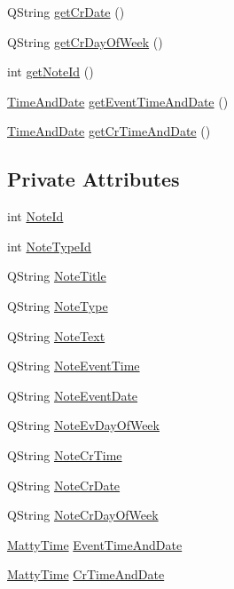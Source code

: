 \begin{DoxyCompactItemize}
\item 
Q\+String \hyperlink{classMattyNote_ade5ef053d6d9ba158d9842feadd39754}{get\+Cr\+Date} ()
\item 
Q\+String \hyperlink{classMattyNote_a92dca9930c5f9b00991a780fc89acb8f}{get\+Cr\+Day\+Of\+Week} ()
\item 
int \hyperlink{classMattyNote_ad7c5837f61e4813005ae063c67b9a0f0}{get\+Note\+Id} ()
\item 
\hyperlink{structTimeAndDate}{Time\+And\+Date} \hyperlink{classMattyNote_ac2579a4c26f27c8d86b6a57c81f5dc3b}{get\+Event\+Time\+And\+Date} ()
\item 
\hyperlink{structTimeAndDate}{Time\+And\+Date} \hyperlink{classMattyNote_aff50eb125d7a0a64ac3fb21f056ec745}{get\+Cr\+Time\+And\+Date} ()
\end{DoxyCompactItemize}
\subsection*{Private Attributes}
\begin{DoxyCompactItemize}
\item 
int \hyperlink{classMattyNote_a15a3c21ef00e8c629aeb58025121b0a9}{Note\+Id}
\item 
int \hyperlink{classMattyNote_ad116cdf301951c8c93ee2a81a0df8647}{Note\+Type\+Id}
\item 
Q\+String \hyperlink{classMattyNote_a185f1f13eeb93acb237b9db7b4c94229}{Note\+Title}
\item 
Q\+String \hyperlink{classMattyNote_a0b45b382884fac5b651ab1ce155a2c13}{Note\+Type}
\item 
Q\+String \hyperlink{classMattyNote_ab54fa825ed3ce8081befdb0c391d682b}{Note\+Text}
\item 
Q\+String \hyperlink{classMattyNote_a3e69ae7fb7c8c616594a9647c14a192e}{Note\+Event\+Time}
\item 
Q\+String \hyperlink{classMattyNote_a9644cd6552e27c1875d83edce2469db3}{Note\+Event\+Date}
\item 
Q\+String \hyperlink{classMattyNote_a1182beac3edac3a7a7e4cdce72fc02ce}{Note\+Ev\+Day\+Of\+Week}
\item 
Q\+String \hyperlink{classMattyNote_a03208145949dfb98a99cfd9d95373418}{Note\+Cr\+Time}
\item 
Q\+String \hyperlink{classMattyNote_a3b94a4b062d2c2335f410f252210ed20}{Note\+Cr\+Date}
\item 
Q\+String \hyperlink{classMattyNote_a3776d088e67ef0181116b1cc2db3fd94}{Note\+Cr\+Day\+Of\+Week}
\item 
\hyperlink{classMattyTime}{Matty\+Time} \hyperlink{classMattyNote_a1f870bad84b62162b8ee07bff70e3003}{Event\+Time\+And\+Date}
\item 
\hyperlink{classMattyTime}{Matty\+Time} \hyperlink{classMattyNote_ae2959e86661be06281c70a5b87390587}{Cr\+Time\+And\+Date}
\end{DoxyCompactItemize}


